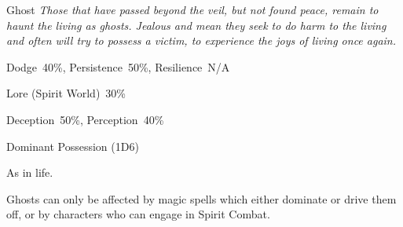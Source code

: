 \begin{monsterbox}{Ghost}
	\textit{Those that have passed beyond the veil, but not found peace, remain to haunt the living as ghosts. Jealous and mean they seek to do harm to the living and often will try to possess a victim, to experience the joys of living once again.}\\
	\rpghline
	\basics[%
	powerpoints = 11,
	movementrate = 23m,
	armor = None,
	plunderrating = 0-5
	]
	\rpghline%
	\stats[ %
		STR = -,
		CON = -,
		DEX = -,
		SIZ = -,
		INT = 3D6   (11),
		POW = 3D6   (11),
		CHA = 3D6   (11)
	]
	\rpghline
	\begin{rpg-monsteraction}[Resistances]
		Dodge~40\%, Persistence~50\%, Resilience~N/A\
	\end{rpg-monsteraction}
	\begin{rpg-monsteraction}[Knowledge]
		Lore (Spirit World)~30\%
	\end{rpg-monsteraction}
	\begin{rpg-monsteraction}[Practical]
		Deception~50\%, Perception~40\%
	\end{rpg-monsteraction}
	\begin{rpg-monsteraction}
		Dominant Possession (1D6)
	\end{rpg-monsteraction}
	\begin{rpg-monsteraction}[Magic]
		As in life.
	\end{rpg-monsteraction}
	\begin{rpg-monsteraction}[Other]
		Ghosts can only be affected by magic spells which either dominate or drive them off, or by characters who can engage in Spirit Combat.
	\end{rpg-monsteraction}
\end{monsterbox}
	


